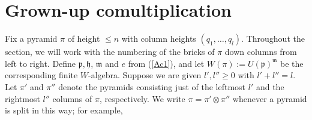 \documentclass[twoside,12pt,reqno]{amsart}
\begin{document}
\section{Grown-up comultiplication}\label{sgrownup}

Fix a pyramid $\pi$ of height $\leq n$ with column heights
$(q_1,\dots,q_l)$.
Throughout the section, we will work with the numbering
of the bricks of $\pi$ down columns from left to right.
Define $\mathfrak{p}, \mathfrak{h}$, $\mathfrak{m}$ and $e$
from (\ref{Ac1}), and
let $W(\pi) := U(\mathfrak{p})^{\mathfrak{m}}$
be the corresponding finite $W$-algebra.
Suppose we are given $l',l'' \geq 0$
with $l'+l'' = l$.
Let $\pi'$ and $\pi''$
denote the pyramids consisting just of
the leftmost $l'$ and the rightmost $l''$
columns of $\pi$, respectively.
We write $\pi = \pi' \otimes \pi''$ whenever
a pyramid is split in this way; for example,
\end{document}
